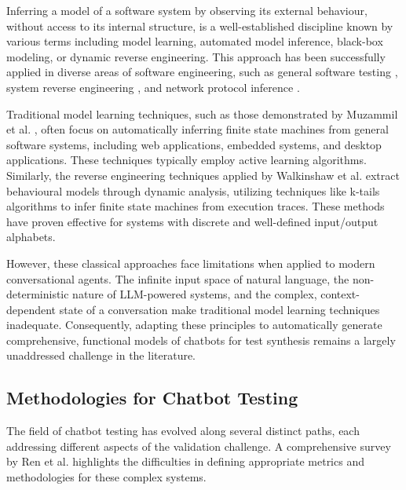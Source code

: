 Inferring a model of a software system by observing its external behaviour,
without access to its internal structure,
is a well-established discipline known by various terms including
model learning, automated model inference, black-box modeling, or dynamic reverse engineering.
This approach has been successfully applied in diverse areas of software engineering,
such as general software testing \autocite{aichernigModelLearningModelBased2018},
system reverse engineering \autocite{hajipourIReEnReverseEngineeringBlackBox2021, menguyBlackboxCodeAnalysis2023},
and network protocol inference \autocite{luoDynPREProtocolReverse}.

Traditional model learning techniques,
such as those demonstrated by Muzammil et al. \autocite{shahbazAnalysisTestingBlackbox2014},
often focus on automatically inferring finite state machines
from general software systems,
including web applications, embedded systems, and desktop applications.
These techniques typically employ active learning algorithms.
Similarly, the reverse engineering techniques applied by Walkinshaw et al. \autocite{walkinshawReverseEngineeringSoftwareBehavior2013}
extract behavioural models through dynamic analysis,
utilizing techniques like k-tails algorithms
\autocite{biermannSynthesisFiniteStateMachines1972}
to infer finite state machines from execution traces.
These methods have proven effective for
systems with discrete and well-defined input/output alphabets.

However, these classical approaches
face limitations when applied to modern conversational agents.
The infinite input space of natural language,
the non-deterministic nature of \ac{LLM}-powered systems,
and the complex, context-dependent state of a conversation
make traditional model learning techniques inadequate.
Consequently,
adapting these principles to automatically generate
comprehensive, functional models of chatbots for test synthesis
remains a largely unaddressed challenge in the literature.

\subsection{Methodologies for Chatbot Testing}

The field of chatbot testing has evolved along several distinct paths,
each addressing different aspects of the validation challenge.
A comprehensive survey by Ren et al. \autocite{renEvaluationTechniquesChatbot2019} highlights the difficulties
in defining appropriate metrics and methodologies for these complex systems.

